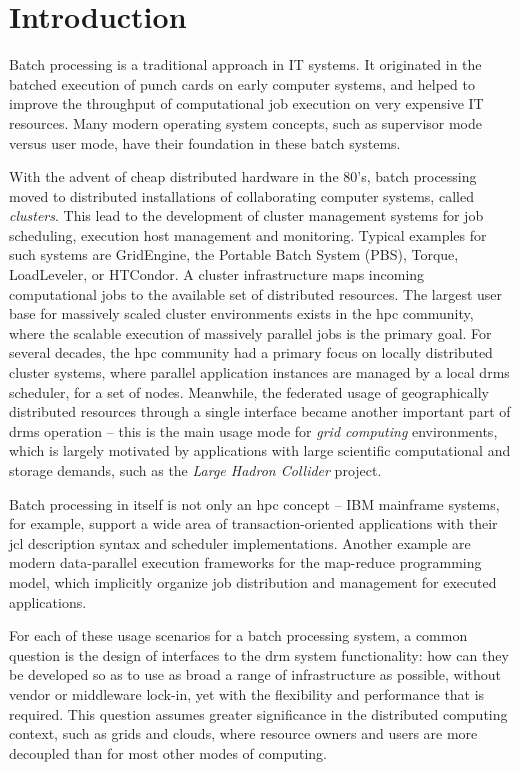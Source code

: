 \documentclass[twocolumn]{svjour3}       %
\begin{document}
\sloppy

\section{Introduction}
\label{intro}

Batch processing is a traditional approach in IT systems. It originated in the batched execution of punch cards on early computer systems, and helped to improve the throughput of computational job execution on very expensive IT resources. Many modern operating system concepts, such as supervisor mode versus user mode, have their foundation in these batch systems. 

 With the advent of cheap distributed hardware in the 80's, batch processing moved to distributed installations of collaborating computer systems, called \emph{clusters}. This lead to the development of cluster management systems for job scheduling, execution host management and monitoring. Typical examples for such systems are GridEngine, the Portable Batch System (PBS), Torque, LoadLeveler, or HTCondor. A cluster infrastructure maps incoming computational jobs to the available set of distributed resources. The largest user base for massively scaled cluster environments exists in the \gls{hpc} community, where the scalable execution of massively parallel jobs is the primary goal. For several decades, the \gls{hpc} community had a primary focus on locally distributed cluster systems, where parallel application instances are managed by a local \gls{drms} scheduler, for a set of nodes. Meanwhile, the federated usage of geographically distributed resources through a single interface became another important part of \gls{drms} operation -- this is the main usage mode for \emph{grid computing} environments, which is largely motivated by applications with large scientific computational and storage demands, such as the \emph{Large Hadron Collider} project. 

 Batch processing in itself is not only an \gls{hpc} concept -- IBM mainframe systems, for example, support a wide area of transaction-oriented applications with their \gls{jcl} description syntax and scheduler implementations. Another example are modern data-parallel execution frameworks for the map-reduce programming model, which implicitly organize job distribution and management for executed applications.

For each of these usage scenarios for a batch processing system, a common question is the design of interfaces to the \gls{drm} system functionality: how can they be developed so as to use as broad a range of infrastructure as possible, without vendor or middleware lock-in, yet with the flexibility and performance that is required. This question assumes greater significance in the distributed computing context, such as grids and clouds, where resource owners and users are more decoupled than for most other modes of computing.
\end{document}
